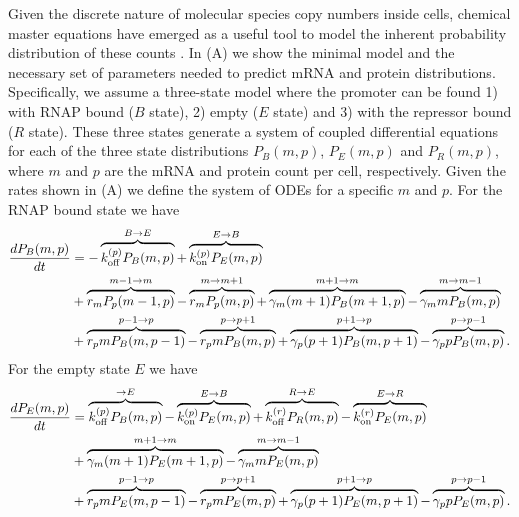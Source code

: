 Given the discrete nature of molecular species copy numbers inside cells,
chemical master equations have emerged as a useful tool to model the inherent
probability distribution of these counts \cite{Sanchez2013}. In
(A) we show the minimal model and the necessary set of
parameters needed to predict mRNA and protein distributions. Specifically, we
assume a three-state model where the promoter can be found 1) with RNAP bound
($B$ state), 2) empty ($E$ state) and 3) with the repressor bound ($R$ state).
These three states generate a system of coupled differential equations for each
of the three state distributions $P_B(m, p)$, $P_E(m, p)$ and $P_R(m, p)$, where
$m$ and $p$ are the mRNA and protein count per cell, respectively. Given the
rates shown in (A) we define the system of ODEs for a
specific $m$ and $p$. For the RNAP bound state we have
\begin{equation}
  \begin{aligned}
    \dt{P_B(m, p)} &=
    - \overbrace{\kpoff P_B(m, p)}^{B \rightarrow E} %
    + \overbrace{\kpon P_E(m, p)}^{E \rightarrow B}\\ %
    &+ \overbrace{r_m P_p(m-1, p)}^{m-1 \rightarrow m} %
    - \overbrace{r_m P_p(m, p)}^{m \rightarrow m+1}%
    + \overbrace{\gm (m + 1) P_B(m+1 , p)}^{m+1 \rightarrow m} %
    - \overbrace{\gm m P_B(m , p)}^{m \rightarrow m-1}\\ %
    &+ \overbrace{r_p m P_B(m, p - 1)}^{p-1 \rightarrow p} %
    - \overbrace{r_p m P_B(m, p)}^{p \rightarrow p+1} %
    + \overbrace{\gp (p + 1) P_B(m, p + 1)}^{p + 1 \rightarrow p} %
    - \overbrace{\gp p P_B(m, p)}^{p \rightarrow p-1}. %
  \end{aligned}
\end{equation}
For the empty state $E$ we have
\begin{equation}
  \begin{aligned}
    \dt{P_E(m, p)} &=
    \overbrace{\kpoff P_B(m, p)}^{ \rightarrow E} %
    - \overbrace{\kpon P_E(m, p)}^{E \rightarrow B} %
    + \overbrace{\kroff P_R(m, p)}^{R \rightarrow E} %
    - \overbrace{\kron P_E(m, p)}^{E \rightarrow R}\\ %
    &+ \overbrace{\gm (m + 1) P_E(m+1 , p)}^{m+1 \rightarrow m} %
    - \overbrace{\gm m P_E(m , p)}^{m \rightarrow m-1}\\ %
    &+ \overbrace{r_p m P_E(m, p - 1)}^{p-1 \rightarrow p} %
    - \overbrace{r_p m P_E(m, p)}^{p \rightarrow p+1} %
    + \overbrace{\gp (p + 1) P_E(m, p + 1)}^{p + 1 \rightarrow p} %
    - \overbrace{\gp p P_E(m, p)}^{p \rightarrow p-1}. %
  \end{aligned}
\end{equation}
